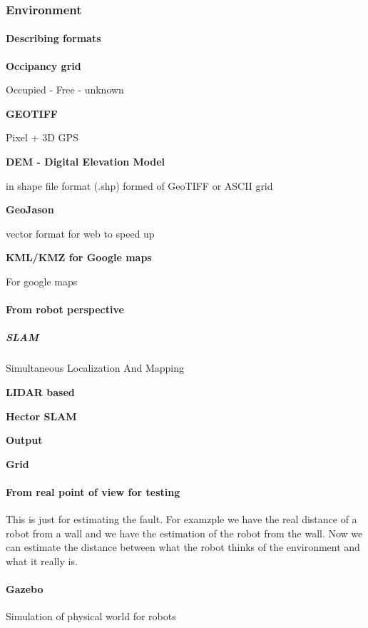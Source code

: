 \documentclass{book}
\providecommand{\ProjectDeepHeading}[2]{%
    \par\medskip\noindent\textbf{#2}\par\smallskip
}
\begin{document}

\subsubsection{Environment}

\paragraph{Describing formats}
    \ProjectDeepHeading{2}{Occipancy grid}
        Occupied - Free  - unknown
    
    
    \ProjectDeepHeading{2}{GEOTIFF}
        Pixel + 3D GPS
        
    \ProjectDeepHeading{2}{DEM - Digital Elevation Model}
        in shape file format (.shp) formed of GeoTIFF or ASCII grid
        
    \ProjectDeepHeading{2}{GeoJason}
        vector format for web to speed up
        
    \ProjectDeepHeading{2}{KML/KMZ for Google maps}
        For google maps


\paragraph{From robot perspective}
    \subparagraph{SLAM}
        Simultaneous Localization And Mapping
        \ProjectDeepHeading{1}{LIDAR based}
            \ProjectDeepHeading{1}{Hector SLAM}
        \ProjectDeepHeading{1}{Output}
            \ProjectDeepHeading{2}{Grid}

\paragraph{From real point of view for testing}
    This is just for estimating the fault. For examzple we have the real distance of a robot from a wall and we have the estimation of the robot from the wall. Now we can estimate the distance between what the robot thinks of the environment and what it really is.


\paragraph{Gazebo}
Simulation of physical world for robots

\end{document}
